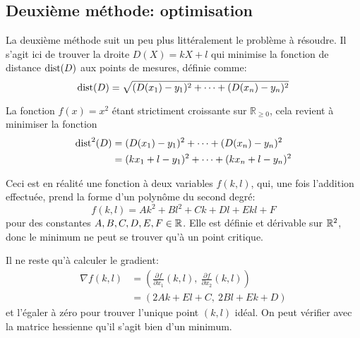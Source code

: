 \subsection{Deuxième méthode: optimisation}

La deuxième méthode suit un peu plus littéralement
le problème à résoudre.
Il s'agit ici de trouver la droite $D(X) = kX+l$
qui minimise la fonction de distance $\mathrm{dist}(D)$
aux points de mesures, définie comme:
\begin{equation}
    \mathrm{dist}(D) = \sqrt{(D(x_1)-y_1)^2+\cdots+(D(x_n)-y_n)^2}
\end{equation}

La fonction $f(x)=x^2$ étant strictiment croissante sur $\mathbb{R}_{\geq 0}$,
cela revient à minimiser la fonction
\begin{equation}
    \begin{aligned}
        \mathrm{dist}^2(D) &= (D(x_1)-y_1)^2+\cdots+(D(x_n)-y_n)^2 \\
                   &= (kx_1+l-y_1)^2+\cdots+(kx_n+l-y_n)^2
    \end{aligned}
\end{equation}

Ceci est en réalité une fonction à deux variables $f(k,l)$,
qui, une fois l'addition effectuée, prend la forme
d'un polynôme du second degré:
\begin{equation}
    f(k,l) = Ak^2+Bl^2+Ck+Dl+Ekl+F
\end{equation}
pour des constantes $A,B,C,D,E,F \in \mathbb{R}$.
Elle est définie et dérivable sur $\mathbb{R}^2$,
donc le minimum ne peut se trouver qu'à un point critique.

Il ne reste qu'à calculer le gradient:
\begin{equation}
    \begin{aligned}
        \nabla f(k,l) &= \left(\frac{\partial f}{\partial x_1}(k,l),\ 
            \frac{\partial f}{\partial x_2}(k,l)\right) \\
        &= (2Ak+El+C,\ 2Bl+Ek+D)
    \end{aligned}
\end{equation}
et l'égaler à zéro pour trouver l'unique point $(k,l)$ idéal.
On peut vérifier avec la matrice hessienne qu'il s'agit bien
d'un minimum.

